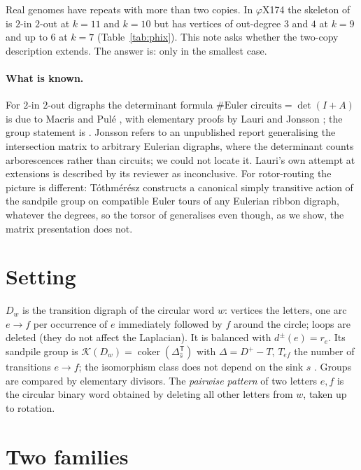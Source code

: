 \documentclass[11pt]{article}
\theoremstyle{plain}
\theoremstyle{definition}
\theoremstyle{remark}
\newcommand{\K}{\mathcal{K}}
\newcommand{\coker}{\operatorname{coker}}
\begin{document}
Real genomes have repeats with more than two copies. In $\varphi$X174 the skeleton of
\cite{Bio3} is $2$-in $2$-out at $k=11$ and $k=10$ but has vertices of out-degree $3$ and
$4$ at $k=9$ and up to $6$ at $k=7$ (Table~\ref{tab:phix}). This note asks whether the
two-copy description extends. The answer is: only in the smallest case.

\paragraph{What is known.} For $2$-in $2$-out digraphs the determinant formula
$\#\text{Euler circuits}=\det(I+A)$ is due to Macris and Pul\'e \cite{MacrisPule}, with
elementary proofs by Lauri and Jonsson \cite{Jonsson}; the group statement is
\cite{MMN}. Jonsson \cite[p.~192]{Jonsson} refers to an unpublished report generalising
the intersection matrix to arbitrary Eulerian digraphs, where the determinant counts
arborescences rather than circuits; we could not locate it. Lauri's own attempt at
extensions \cite{Lauri} is described by its reviewer as inconclusive. For rotor-routing
the picture is different: T\'othm\'er\'esz \cite{Toth} constructs a canonical simply
transitive action of the sandpile group on compatible Euler tours of any Eulerian ribbon
digraph, whatever the degrees, so the torsor of \cite{Bio2} generalises even though, as
we show, the matrix presentation does not.

\section{Setting}\label{sec:setting}

$D_w$ is the transition digraph of the circular word $w$: vertices the letters, one arc
$e\to f$ per occurrence of $e$ immediately followed by $f$ around the circle; loops are
deleted (they do not affect the Laplacian). It is balanced with $d^{\pm}(e)=r_e$. Its
sandpile group is $\K(D_w)=\coker(\Delta_{\hat s}^{\mathsf T})$ with $\Delta=D^{+}-T$,
$T_{ef}$ the number of transitions $e\to f$; the isomorphism class does not depend on the
sink $s$ \cite[Lem.~4.12]{HLMPPW}. Groups are compared by elementary divisors. The
\emph{pairwise pattern} of two letters $e,f$ is the circular binary word obtained by
deleting all other letters from $w$, taken up to rotation.

\section{Two families}\label{sec:two}
\end{document}
